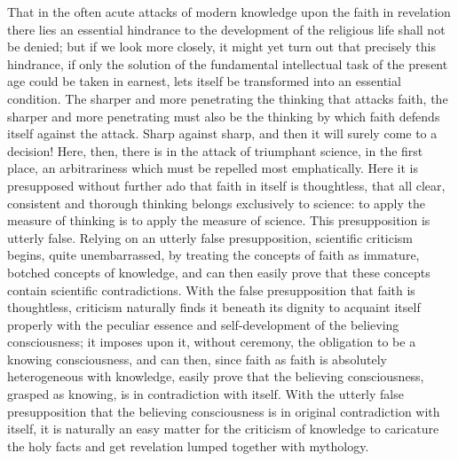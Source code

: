 \documentclass[12pt]{book}
\newcommand{\opage}[1]{\marginnote{\footnotesize\textit{[#1]}}}
\begin{document}
That in the often acute attacks of modern knowledge upon the faith in
revelation there lies an essential hindrance to the development of the
religious life shall not be denied; but if we look more closely, it
might yet turn out that precisely this hindrance, if only the solution
of the fundamental intellectual task of the present age could be taken
in earnest, lets itself be transformed into an essential condition. The
sharper and more penetrating the thinking that attacks faith, the
sharper and more penetrating must also be the thinking by which faith
defends itself against the attack. Sharp against sharp, and then it
will surely come to a decision! Here, then, there is in the attack of
triumphant science, in the first place, an arbitrariness which must be
repelled most emphatically. Here it is presupposed without further ado
that faith in itself is thoughtless, that all clear, consistent and
thorough thinking belongs exclusively to science: to apply the measure
of thinking is to apply the measure of science. This presupposition is
utterly false. Relying on an utterly false presupposition, scientific
criticism begins, quite unembarrassed, by treating the concepts of faith
as
\opage{101}\setcounter{footnote}{0}%
immature, botched concepts of knowledge, and can then easily prove that
these concepts contain scientific contradictions. With the false
presupposition that faith is thoughtless, criticism naturally finds it
beneath its dignity to acquaint itself properly with the peculiar
essence and self-development of the believing consciousness; it imposes
upon it, without ceremony, the obligation to be a knowing consciousness,
and can then, since faith as faith is absolutely heterogeneous with
knowledge, easily prove that the believing consciousness, grasped as
knowing, is in contradiction with itself. With the utterly false
presupposition that the believing consciousness is in original
contradiction with itself, it is naturally an easy matter for the
criticism of knowledge to caricature the holy facts and get revelation
lumped together with mythology.
\end{document}
